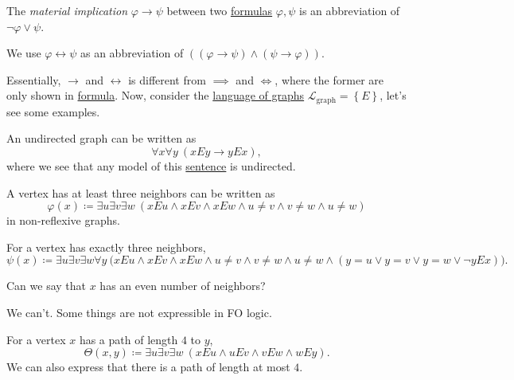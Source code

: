\begin{notation}
	The \emph{material implication} \(\varphi \to \psi \) between two \hyperref[def:formula]{formulas} \(\varphi, \psi \) is an abbreviation of \(\lnot \varphi \lor \psi\).
\end{notation}

\begin{notation}
	We use \(\varphi \leftrightarrow \psi \) as an abbreviation of \(((\varphi \to \psi ) \land (\psi \to \varphi ))\).
\end{notation}

Essentially, \(\to \) and \(\leftrightarrow\) is different from \(\implies \) and \(\iff \), where the former are only shown in \hyperref[def:formula]{formula}. Now, consider the \hyperref[eg:language-graph]{language of graphs} \(\mathcal{L} _{\text{graph} } = \left\{ E\right\} \), let's see some examples.
\begin{eg}
	An undirected graph can be written as
	\[
		\forall x\forall y\ (xEy \to yEx),
	\]
	where we see that any model of this \hyperref[def:sentence]{sentence} is undirected.
\end{eg}

\begin{eg}
	A vertex has at least three neighbors can be written as
	\[
		\varphi (x) \coloneqq \exists u\exists v\exists w\ (xEu \land xEv \land xEw \land u \neq v\land v \neq w\land u \neq w)
	\]
	in non-reflexive graphs.
\end{eg}

\begin{eg}
	For a vertex has exactly three neighbors,
	\[
		\psi (x)\coloneqq \exists u \exists v \exists w \forall y\ \big(xEu \land xEv \land xEw \land u \neq v\land v \neq w\land u \neq w \land (y = u \lor y = v \lor y = w \lor \lnot y E x)\big).
	\]
\end{eg}

\begin{problem*}
	Can we say that \(x\) has an even number of neighbors?
\end{problem*}
\begin{answer}
	We can't. Some things are not expressible in FO logic.
\end{answer}

\begin{eg}
	For a vertex \(x\) has a path of length \(4\) to \(y\),
	\[
		\Theta (x, y) \coloneqq \exists u \exists v \exists w\ (xEu \land uEv \land vEw \land wEy).
	\]
	We can also express that there is a path of length at most \(4\).
\end{eg}

